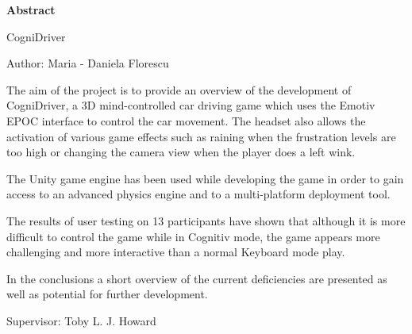 \vspace*{\fill}

\begin{center}
	\Large
	\vspace{0.9cm}
    \textbf{Abstract}
    
    CogniDriver
    
    Author: Maria - Daniela Florescu    
\end{center}

The aim of the project is to provide an overview of the development of CogniDriver, a 3D mind-controlled car driving game which uses the Emotiv EPOC interface to control the car movement. The headset also allows the activation of various game effects such as raining when the frustration levels are too high or changing the camera view when the player does a left wink.

The Unity game engine has been used while developing the game in order to gain access to an advanced physics engine and to a multi-platform deployment tool.

The results of user testing on 13 participants have shown that although it is more difficult to control the game while in Cognitiv mode, the game appears more challenging and more interactive than a normal Keyboard mode play. 

In the conclusions a short overview of the current deficiencies are presented as well as potential for further development.

\begin{center}  
	\Large  
    Supervisor: Toby L. J. Howard
\end{center}

\vspace*{\fill}